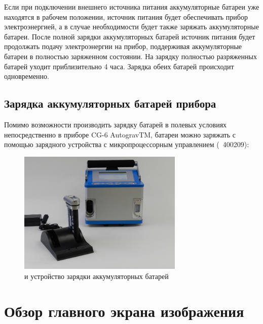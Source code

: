 Если при подключении внешнего источника питания аккумуляторные батареи уже
находятся в рабочем положении, источник питания будет обеспечивать прибор
электроэнергией, а в случае необходимости будет также заряжать аккумуляторные
батареи. После полной зарядки аккумуляторных батарей источник питания будет
продолжать подачу электроэнергии на прибор, поддерживая аккумуляторные батареи в
полностью заряженном состоянии. На зарядку полностью разряженных батарей уходит
приблизительно 4 часа. Зарядка обеих батарей происходит одновременно.


\subsection[Зарядка аккумуляторных батарей]{Зарядка аккумуляторных батарей прибора \cg{}}

Помимо возможности производить зарядку батарей в полевых условиях
непосредственно в приборе CG-6 AutogravTM, батареи можно заряжать с помощью
зарядного устройства с микропроцессорным управлением (\textnumero{}~400209):

\begin{figure}[h]
  \centering
  \includegraphics[width=0.7\textwidth]{figures/the_cg6_autograv_gravity_meter_and_the_battery_charger}
  \caption{\cg{} и устройство зарядки аккумуляторных батарей}
  \label{fig:the_cg6_autograv_gravity_meter_and_the_battery_charger}
\end{figure}

\section{Обзор главного экрана изображения}

